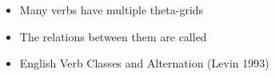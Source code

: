 \documentclass[headrule,footrule]{foils}
\begin{document}
\begin{itemize}
\item  Many verbs have multiple theta-grids
  \begin{exe}
    \ex
    \begin{xlist}
      \ex {}
      \ex {}
      \ex {}
    \end{xlist}
    \ex
    \begin{xlist}
      \ex {}
      \ex {}
    \end{xlist}
  \end{exe}  
\item  The relations between them are called 
\item  English Verb Classes and Alternation (Levin 1993)
\end{itemize}


\end{document}
